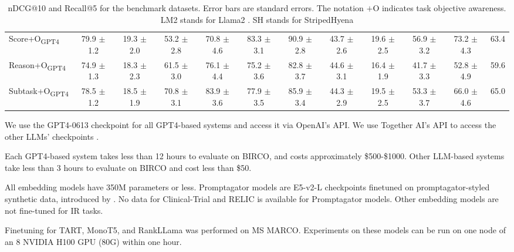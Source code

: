 \documentclass[11pt]{article}
\begin{document}
\begin{table}
\begin{tabular}{l cc | cc | cc | cc | cc | C{1cm}}
\\ 
Score+O\textsubscript{\scriptsize{GPT4}}    &  79.9 $\pm$ 1.2  &  19.3 $\pm$ 2.0  &  53.2 $\pm$ 2.8  &  70.8 $\pm$ 4.6  &  83.3 $\pm$ 3.1  &  90.9 $\pm$ 2.8  &  43.7 $\pm$ 2.6  &  19.6 $\pm$ 2.5  &  56.9 $\pm$ 3.2  &  73.2 $\pm$ 4.3  &  63.4 \\ 
Reason+O\textsubscript{\scriptsize{GPT4}}    &  74.9 $\pm$ 1.3  &  18.3 $\pm$ 2.3  &  61.5 $\pm$ 3.0  &  76.1 $\pm$ 4.4  &  75.2 $\pm$ 3.6  &  82.8 $\pm$ 3.7  &  44.6 $\pm$ 3.1  &  16.4 $\pm$ 1.9  &  41.7 $\pm$ 3.3  &  52.8 $\pm$ 4.9  &  59.6 \\ 
Subtask+O\textsubscript{\scriptsize{GPT4}}    &  78.5 $\pm$ 1.2  &  18.5 $\pm$ 1.9  &  70.8 $\pm$ 3.1  &  83.9 $\pm$ 3.6  &  77.9 $\pm$ 3.5  &  85.9 $\pm$ 3.4  &  44.3 $\pm$ 2.9  &  19.5 $\pm$ 2.5  &  53.3 $\pm$ 3.7  &  66.0 $\pm$ 4.6  &  65.0\\ 
\bottomrule
\end{tabular}
\caption{nDCG@10 and Recall@5 for the benchmark datasets. 
Error bars are standard errors. The notation $+$O indicates task objective awareness. LM2 stands for Llama2 \cite{llama2}. SH stands for StripedHyena \cite{StripedHyena}}
\label{tab: model_performance_combined_app}
\end{table}

We use the GPT4-0613 checkpoint for all GPT4-based systems and access it via OpenAI's API. We use Together AI's API to access the other LLMs' checkpoints \cite{together_ai}.

Each GPT4-based system takes less than 12 hours to evaluate on BIRCO, and costs approximately \$500-\$1000. Other LLM-based systems take less than 3 hours to evaluate on BIRCO and cost less than \$50. 

All embedding models have 350M parameters or less. Promptagator models are E5-v2-L checkpoints finetuned on promptagator-styled \cite{promptagator} synthetic data, introduced by \cite{ir2}. No data for Clinical-Trial and RELIC is available for Promptagator models. Other embedding models are not fine-tuned for IR tasks. 


Finetuning for TART, MonoT5, and RankLLama was performed on MS MARCO. Experiments on these models can be run on one node of an 8 NVIDIA H100 GPU (80G) within one hour. 
\end{document}
